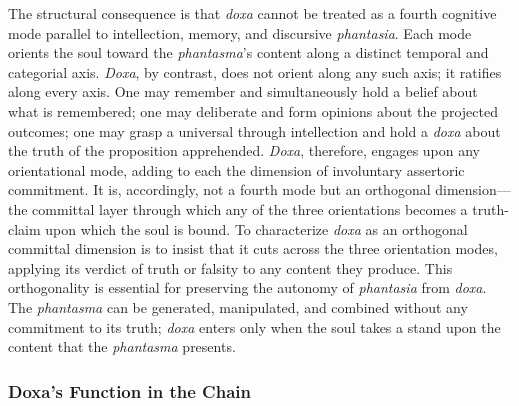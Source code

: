 \documentclass{article}
\begin{document}
The structural consequence is that \textit{doxa} cannot be treated as a fourth cognitive mode parallel to intellection, memory, and discursive \textit{phantasia}. Each mode orients the soul toward the \textit{phantasma}'s content along a distinct temporal and categorial axis. \textit{Doxa}, by contrast, does not orient along any such axis; it ratifies along every axis. One may remember and simultaneously hold a belief about what is remembered; one may deliberate and form opinions about the projected outcomes; one may grasp a universal through intellection and hold a \textit{doxa} about the truth of the proposition apprehended. \textit{Doxa}, therefore, engages upon any orientational mode, adding to each the dimension of involuntary assertoric commitment. It is, accordingly, not a fourth mode but an orthogonal dimension---the committal layer through which any of the three orientations becomes a truth-claim upon which the soul is bound. To characterize \textit{doxa} as an orthogonal committal dimension is to insist that it cuts across the three orientation modes, applying its verdict of truth or falsity to any content they produce. This orthogonality is essential for preserving the autonomy of \textit{phantasia} from \textit{doxa}. The \textit{phantasma} can be generated, manipulated, and combined without any commitment to its truth; \textit{doxa} enters only when the soul takes a stand upon the content that the \textit{phantasma} presents. 

\subsubsection*{Doxa's Function in the Chain}
\end{document}
